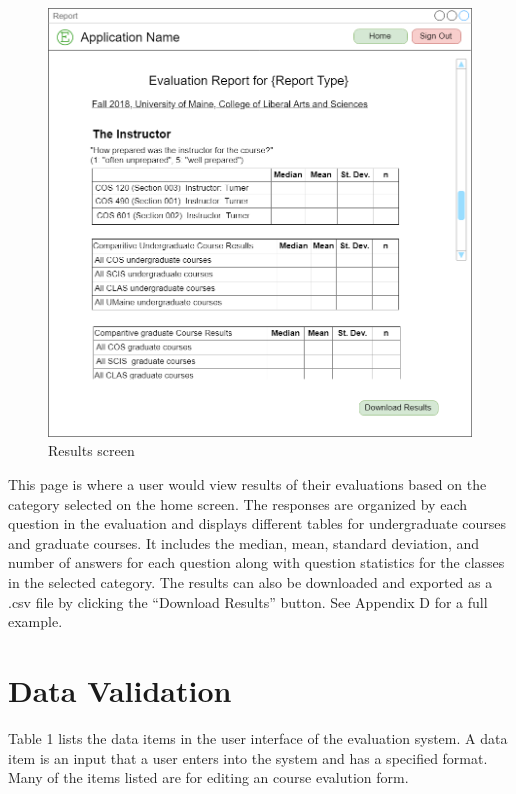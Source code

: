 \documentclass{article}
\begin{document}
\begin{center}
\begin{figure}[H]
    \centering
    \caption{Results screen}
    \includegraphics[width=6.5in]{images/report_screen.png}
\end{figure}
\end{center}

This page is where a user would view results of their evaluations based on the category selected on the home screen.  The responses are organized by each question in the evaluation and displays different tables for undergraduate courses and graduate courses. It includes the median, mean, standard deviation, and number of answers for each question along with question statistics for the classes in the selected category. The results can also be downloaded and exported as a .csv file by clicking the ``Download Results'' button. See Appendix D for a full example.

\newpage

\section{Data Validation}

Table 1 lists the data items in the user interface of the evaluation system. A data item is an input that a user enters into the system and has a specified format. Many of the items listed are for editing an course evalution form.
\end{document}
